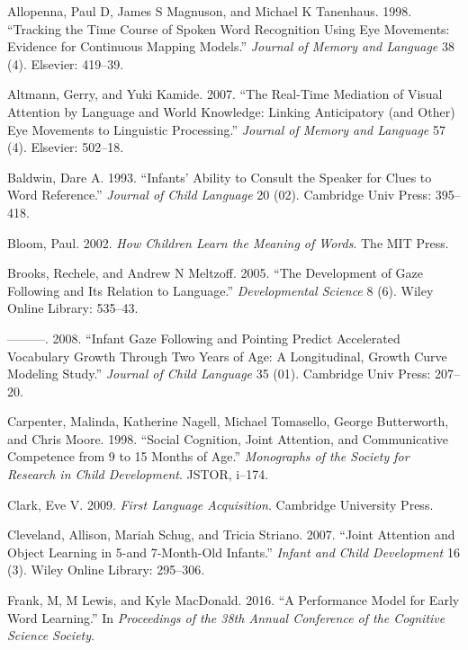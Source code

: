 \documentclass[]{elsarticle} %
\begin{document}
\setlength{\parindent}{-0.3in} \setlength{\leftskip}{0.3in} \noindent

\hypertarget{refs}{}
\hypertarget{ref-allopenna1998tracking}{}
Allopenna, Paul D, James S Magnuson, and Michael K Tanenhaus. 1998.
``Tracking the Time Course of Spoken Word Recognition Using Eye
Movements: Evidence for Continuous Mapping Models.'' \emph{Journal of
Memory and Language} 38 (4). Elsevier: 419--39.

\hypertarget{ref-altmann2007real}{}
Altmann, Gerry, and Yuki Kamide. 2007. ``The Real-Time Mediation of
Visual Attention by Language and World Knowledge: Linking Anticipatory
(and Other) Eye Movements to Linguistic Processing.'' \emph{Journal of
Memory and Language} 57 (4). Elsevier: 502--18.

\hypertarget{ref-baldwin1993infants}{}
Baldwin, Dare A. 1993. ``Infants' Ability to Consult the Speaker for
Clues to Word Reference.'' \emph{Journal of Child Language} 20 (02).
Cambridge Univ Press: 395--418.

\hypertarget{ref-bloom2002children}{}
Bloom, Paul. 2002. \emph{How Children Learn the Meaning of Words}. The
MIT Press.

\hypertarget{ref-brooks2005development}{}
Brooks, Rechele, and Andrew N Meltzoff. 2005. ``The Development of Gaze
Following and Its Relation to Language.'' \emph{Developmental Science} 8
(6). Wiley Online Library: 535--43.

\hypertarget{ref-brooks2008infant}{}
---------. 2008. ``Infant Gaze Following and Pointing Predict
Accelerated Vocabulary Growth Through Two Years of Age: A Longitudinal,
Growth Curve Modeling Study.'' \emph{Journal of Child Language} 35 (01).
Cambridge Univ Press: 207--20.

\hypertarget{ref-carpenter1998social}{}
Carpenter, Malinda, Katherine Nagell, Michael Tomasello, George
Butterworth, and Chris Moore. 1998. ``Social Cognition, Joint Attention,
and Communicative Competence from 9 to 15 Months of Age.''
\emph{Monographs of the Society for Research in Child Development}.
JSTOR, i--174.

\hypertarget{ref-clark2009first}{}
Clark, Eve V. 2009. \emph{First Language Acquisition}. Cambridge
University Press.

\hypertarget{ref-cleveland2007joint}{}
Cleveland, Allison, Mariah Schug, and Tricia Striano. 2007. ``Joint
Attention and Object Learning in 5-and 7-Month-Old Infants.''
\emph{Infant and Child Development} 16 (3). Wiley Online Library:
295--306.

\hypertarget{ref-frank2016performance}{}
Frank, M, M Lewis, and Kyle MacDonald. 2016. ``A Performance Model for
Early Word Learning.'' In \emph{Proceedings of the 38th Annual
Conference of the Cognitive Science Society}.
\end{document}
